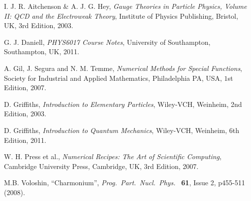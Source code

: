 \documentclass[]{article}
\begin{document}
\begin{thebibliography}{9}
	I. J. R. Aitchenson \& A. J. G. Hey,
	\emph{Gauge Theories in Particle Physics, Volume II: QCD and the Electroweak Theory},
	Institute of Physics Publishing, Bristol, UK,
	3rd Edition,
	2003.
	

  G. J. Daniell,
  \emph{PHYS6017 Course Notes},
  University of Southampton, Southampton, UK,
  2011.
  
  A. Gil, J. Segura and N. M. Temme,
  \emph{Numerical Methods for Special Functions},
  Society for Industrial and Applied Mathematics, Philadelphia PA, USA,
  $1$st Edition,
  2007.
  
  D. Griffiths,
  \emph{Introduction to Elementary Particles},
  Wiley-VCH, Weinheim,
  2nd Edition,
  2003.
  
  D. Griffiths,
  \emph{Introduction to Quantum Mechanics},
  Wiley-VCH, Weinheim,
  6th Edition,
  2011.
  
  W. H. Press et al.,
  \emph{Numerical Recipes: The Art of Scientific Computing},
  Cambridge University Press, Cambridge, UK,
  $3$rd Edition,
  2007.
  
  M.B. Voloshin,
  ``Charmonium'',
  \emph{Prog.\ Part.\ Nucl.\ Phys.\ } \textbf{61},
  Issue 2,
  p455-511 (2008).
  
\end{thebibliography}
\end{document}
